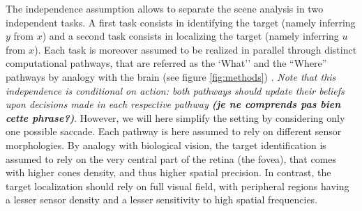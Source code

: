 The independence assumption allows to separate the scene analysis in two independent tasks. A first task consists in identifying the target (namely inferring $y$ from $x$) and a second task consists in localizing the target (namely inferring $u$ from $x$). Each task is moreover assumed to be realized in parallel through distinct computational pathways, that are referred as the  
`What'' and the ``Where'' pathways by analogy with the brain (see figure \ref{fig:methods})\ICANN
{}. \emph{Note that %
this independence is conditional on action: both pathways should update their beliefs upon decisions made in each respective pathway {\bf (je ne comprends pas bien cette phrase?)}}\fi. However, we will here  simplify the setting by considering only one possible saccade.
\ICANN
\else
Each pathway is here assumed to rely on different sensor morphologies. By analogy with biological vision, the target identification is assumed to rely on the very central part of the retina (the fovea), that comes with higher cones density, and thus higher spatial precision. In contrast, the target localization should rely on full visual field, with peripheral regions having a lesser sensor density and a lesser sensitivity to high spatial frequencies. 
\fi


